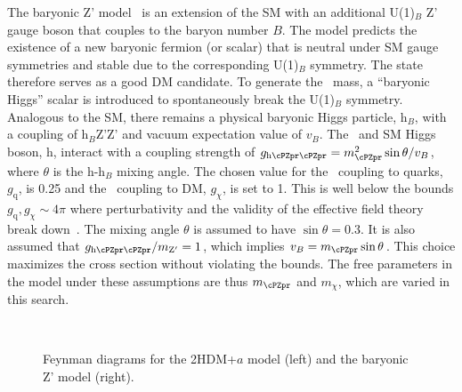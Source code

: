 The baryonic Z' model~\cite{PhysRevD.89.075017} is an extension of the SM with an additional U(1)$_{B}$ Z' gauge 
boson that couples to the baryon number $B$. The model predicts the existence of a new baryonic fermion (or scalar) that is neutral under SM gauge symmetries and stable due to the corresponding U(1)$_{B}$ symmetry. The state therefore serves as a good DM candidate.
To generate the  \cPZpr\ mass, a ``baryonic Higgs'' scalar is introduced to 
spontaneously break the U(1)$_B$ symmetry. Analogous to the SM, there remains 
a physical baryonic Higgs particle, h$_{B}$, with a coupling of h$_{B}$Z'Z' 
and vacuum expectation value of $v_{B}$. 
The \cPZpr\ and SM Higgs boson, h, interact with a coupling strength of 
$g_{\text{h}\cPZpr\cPZpr} = m_{\cPZpr}^{2} \sin \theta/v_{B}$, where $\theta$ is the h-h$_{B}$ 
mixing angle. The chosen value for the \cPZpr\ coupling to quarks,
$g_\text{q}$, is 0.25 and the \cPZpr\ coupling to DM, $g_\chi$, is set to 1. This is well below the bounds $g_\text{q},g_\chi\sim4\pi$ where perturbativity and the validity of the effective field theory break down~\cite{PhysRevD.89.075017}. The mixing angle $\theta$ is assumed to have $\sin\theta= 0.3$. It is also assumed that $g_{\text{h}\cPZpr\cPZpr}/m_{\mathrm{Z}'}=1$, which implies $v_B=m_{\cPZpr}\sin\theta$. This choice maximizes the cross section without violating the bounds. The free parameters in the model under these assumptions are thus $m_{\cPZpr}$ and $m_\chi$, which are varied in this search.

\begin{figure}
\centering
 \hspace{1cm}
  \\
\caption{Feynman diagrams for the 2HDM+$a$ model (left) and the baryonic Z' model (right).}
\label{feyns}
\end{figure}


